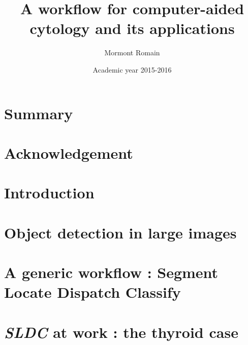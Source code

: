 \documentclass[a4paper,12pt]{report}
\author{Mormont Romain}
\title{A workflow for computer-aided cytology and its applications}
\date{Academic year 2015-2016}
\begin{document}
	
	
	
	\newpage
	
	\tableofcontents
	
	\newpage

	\chapter*{Summary}
	
	\newpage
	
	\chapter*{Acknowledgement}
	
	\newpage
	
	\setcounter{page}{1}
	\chapter{Introduction}
	
	\newpage
	
	\chapter{Object detection in large images}
	
	\newpage
	
	\chapter{A generic workflow : Segment Locate Dispatch Classify}
	
	\newpage
	
	\chapter{\textit{SLDC} at work : the thyroid case}
	
	\newpage
	
\end{document}
